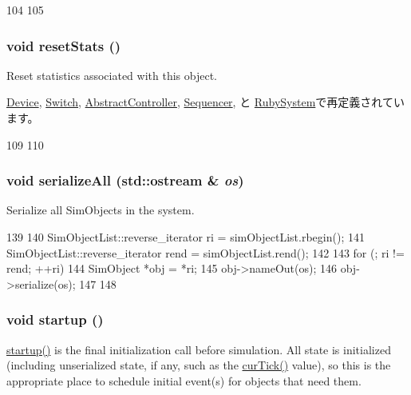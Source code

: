 \begin{DoxyCode}
104 {
105 }
\end{DoxyCode}
\hypertarget{classSimObject_a65880e61108132689a1bd769b9187fb7}{
\subsubsection[{resetStats}]{\setlength{\rightskip}{0pt plus 5cm}void resetStats ()}}
\label{classSimObject_a65880e61108132689a1bd769b9187fb7}
Reset statistics associated with this object. 

\hyperlink{classSinic_1_1Device_a65880e61108132689a1bd769b9187fb7}{Device}, \hyperlink{classSwitch_a65880e61108132689a1bd769b9187fb7}{Switch}, \hyperlink{classAbstractController_a9820f96c5343e42ad3fcbc97b83f59d5}{AbstractController}, \hyperlink{classSequencer_a65880e61108132689a1bd769b9187fb7}{Sequencer}, と \hyperlink{classRubySystem_a65880e61108132689a1bd769b9187fb7}{RubySystem}で再定義されています。


\begin{DoxyCode}
109 {
110 }
\end{DoxyCode}
\hypertarget{classSimObject_acee9d39d800677e32cf1856780ff9761}{
\subsubsection[{serializeAll}]{\setlength{\rightskip}{0pt plus 5cm}void serializeAll (std::ostream \& {\em os})}}
\label{classSimObject_acee9d39d800677e32cf1856780ff9761}
Serialize all SimObjects in the system. 


\begin{DoxyCode}
139 {
140     SimObjectList::reverse_iterator ri = simObjectList.rbegin();
141     SimObjectList::reverse_iterator rend = simObjectList.rend();
142 
143     for (; ri != rend; ++ri) {
144         SimObject *obj = *ri;
145         obj->nameOut(os);
146         obj->serialize(os);
147    }
148 }
\end{DoxyCode}
\hypertarget{classSimObject_aecc7d8debf54990ffeaaed5bac7d7d81}{
\subsubsection[{startup}]{\setlength{\rightskip}{0pt plus 5cm}void startup ()}}
\label{classSimObject_aecc7d8debf54990ffeaaed5bac7d7d81}
\hyperlink{classSimObject_aecc7d8debf54990ffeaaed5bac7d7d81}{startup()} is the final initialization call before simulation. All state is initialized (including unserialized state, if any, such as the \hyperlink{statistics_8hh_a7acdccbf0d35ce0c159c0cdd36371b22}{curTick()} value), so this is the appropriate place to schedule initial event(s) for objects that need them. 

